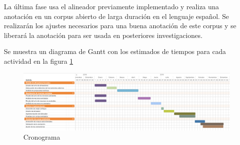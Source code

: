 La última fase usa el alineador previamente implementado y realiza una anotación en un corpus abierto de larga duración en el lenguaje español. Se realizarán los ajustes necesarios para una buena anotación de este corpus y se liberará la anotación para ser usada en posteriores investigaciones.

Se muestra un diagrama de Gantt con los estimados de tiempos para cada actividad en la figura \ref{img:schedule}

\begin{landscape}
\begin{figure}[H]

\centering
\caption{Cronograma}
\label{img:schedule}
\includegraphics[scale=0.40]{images/schedule.png}

\end{figure}
\end{landscape}